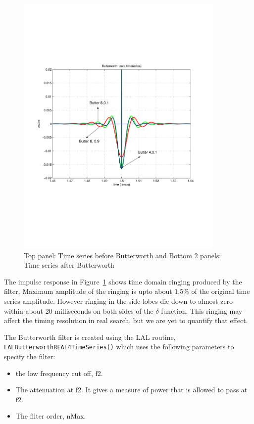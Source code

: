 \begin{figure}[h]
\begin{center}
\includegraphics[width=0.9\textwidth]{figures/butter894comptimeseries}
\caption{Top panel: Time series before Butterworth and 
Bottom 2 panels: Time series after Butterworth} \label{fig:checkbuttertimeseries}
\end{center}
\end{figure}
The impulse response in Figure~\ref{fig:checkbuttertimeseries} shows  
time domain ringing produced by the filter. Maximum amplitude of 
the ringing is upto about $1.5$\% of the original time series amplitude.
However ringing in the side lobes die down to almost zero within about
20 milliseconds on both sides of the $\delta$ function. This ringing may
affect the timing resolution in real search, but we are yet
to quantify that effect.  

The Butterworth filter is created using the LAL routine,
\texttt{LALButterworthREAL4TimeSeries()} which uses the following 
parameters to specify the filter:
\begin{itemize}
  \item the low frequency cut off, f2. 
  \item The attenuation at f2. It gives a measure of power
    that is allowed to pass at f2.
  \item The filter order, nMax.
\end{itemize}

